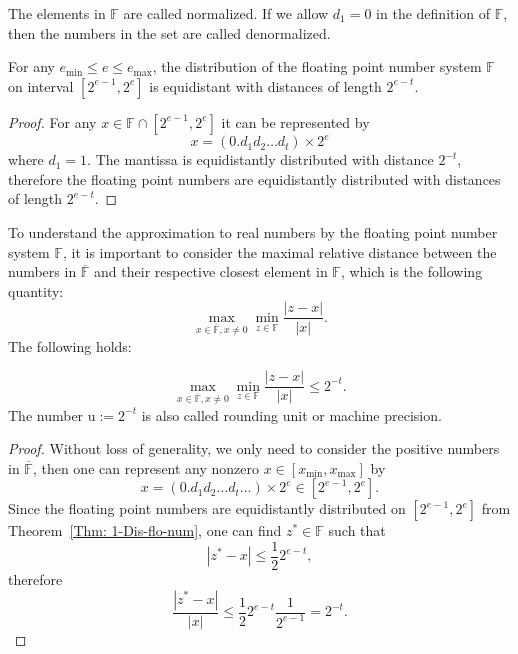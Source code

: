 \begin{remark}
    The elements in $\mathbb{F}$ are called normalized. If we allow $d_1 = 0$ in the definition of $\mathbb{F}$, then the numbers in the set are called denormalized.
\end{remark}

\begin{theorem}
\label{Thm: 1-Dis-flo-num}
    For any $e_{\min} \le e\le e_{\max}$, the distribution of the floating point number system $\mathbb{F}$ on interval $[2^{e-1}, 2^e]$ is equidistant with distances of length $2^{e-t}$.
\end{theorem}

\begin{proof}
    For any  $x \in \mathbb{F}\cap [2^{e-1}, 2^e]$ it can be represented by 
    $$x = (0.d_1d_2\dots d_t)\times 2^{e}$$
    where $d_1 = 1$. The mantissa is equidistantly distributed with distance $2^{-t}$, therefore the floating point numbers are equidistantly distributed with distances of length $2^{e-t}$. 
\end{proof}

To understand the approximation to real numbers by the floating point number system $\mathbb{F}$, it is important to consider the maximal relative distance between the numbers in $\overline{\mathbb{F}}$ and their respective closest element in $\mathbb{F}$, which is the following quantity:
$$\max_{x\in \overline{\mathbb{F}}, x\neq 0}\min_{z\in\mathbb{F}} \frac{|z - x|}{|x|}.$$
The following holds:
\begin{theorem}
\label{Thm: 1-Mac-pre}
    $$\max_{x\in \overline{\mathbb{F}}, x\neq 0}\min_{z\in\mathbb{F}} \frac{|z - x|}{|x|}\le  2^{-t}.$$
    The number $\mathrm{u}:= 2^{-t}$ is also called rounding unit or machine precision.
\end{theorem}
\begin{proof}
    Without loss of generality, we only need to consider the positive numbers in $\overline{\mathbb{F}}$, then one can represent any nonzero $x\in [x_{\min}, x_{\max}]$ by
    $$x = (0.d_1 d_2 \dots d_t\dots)\times 2^e\in [2^{e-1}, 2^e].$$
    Since the floating point numbers are equidistantly distributed on $[2^{e-1}, 2^e]$ from Theorem~\ref{Thm: 1-Dis-flo-num}, one can find $z^{\ast}\in\mathbb{F}$ such that $$|z^{\ast} - x| \le \frac{1}{2} 2^{e-t},$$
    therefore 
    $$\frac{|z^{\ast}- x|}{|x|}\le \frac{1}{2} 2^{e-t} \frac{1}{2^{e-1}} = 2^{-t}.$$
\end{proof}

